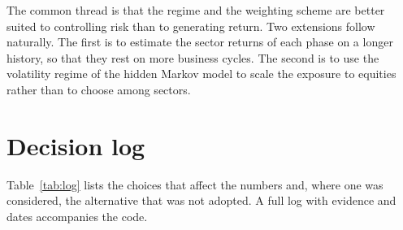 \documentclass[11pt,a4paper]{article}
\begin{document}
The common thread is that the regime and the weighting scheme are better suited to controlling risk than to generating return. Two extensions follow naturally. The first is to estimate the sector returns of each phase on a longer history, so that they rest on more business cycles. The second is to use the volatility regime of the hidden Markov model to scale the exposure to equities rather than to choose among sectors.

\appendix
\section{Decision log}\label{app:log}

Table~\ref{tab:log} lists the choices that affect the numbers and, where one was considered, the alternative that was not adopted. A full log with evidence and dates accompanies the code.
\end{document}
